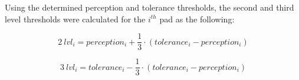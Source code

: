 Using the determined perception and tolerance thresholds, the second and third level thresholds were calculated for the $i^{th}$ pad as the following:

	\begin{equation}
2~lvl_i = perception_i + \frac{1}{3} \cdot (tolerance_i - perception_i)
\end{equation}

\begin{equation}
3~lvl_i = tolerance_i - \frac{1}{3} \cdot (tolerance_i - perception_i)
\end{equation}
       